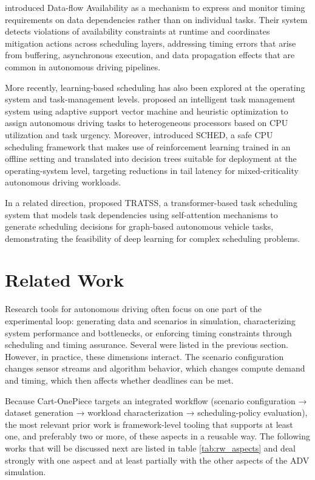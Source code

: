  introduced Data-flow Availability as a mechanism to express and monitor timing requirements on data dependencies rather than on individual tasks. Their system detects violations of availability constraints at runtime and coordinates mitigation actions across scheduling layers, addressing timing errors that arise from buffering, asynchronous execution, and data propagation effects that are common in autonomous driving pipelines.

More recently, learning-based scheduling has also been explored at the operating system and task-management levels.  proposed an intelligent task management system using adaptive support vector machine and heuristic optimization to assign autonomous driving tasks to heterogeneous processors based on CPU utilization and task urgency. Moreover,  introduced SCHED, a safe CPU scheduling framework that makes use of reinforcement learning trained in an offline setting and translated into decision trees suitable for deployment at the operating-system level, targeting reductions in tail latency for mixed-criticality autonomous driving workloads.

In a related direction,  proposed TRATSS, a transformer-based task scheduling system that models task dependencies using self-attention mechanisms to generate scheduling decisions for graph-based autonomous vehicle tasks, demonstrating the feasibility of deep learning for complex scheduling problems.

\section {Related Work}
Research tools for autonomous driving often focus on one part of the experimental loop: generating data and scenarios in simulation, characterizing system performance and bottlenecks, or enforcing timing constraints through scheduling and timing assurance. Several were listed in the previous section. However, in practice, these dimensions interact. The scenario configuration changes sensor streams and algorithm behavior, which changes compute demand and timing, which then affects whether deadlines can be met. 

Because Cart-OnePiece targets an integrated workflow (scenario configuration → dataset generation → workload characterization → scheduling-policy evaluation), the most relevant prior work is framework-level tooling that supports at least one, and preferably two or more, of these aspects in a reusable way. The following works that will be discussed next are listed in table \ref{tab:rw_aspects} and deal strongly with one aspect and at least partially with the other aspects of the ADV simulation.

